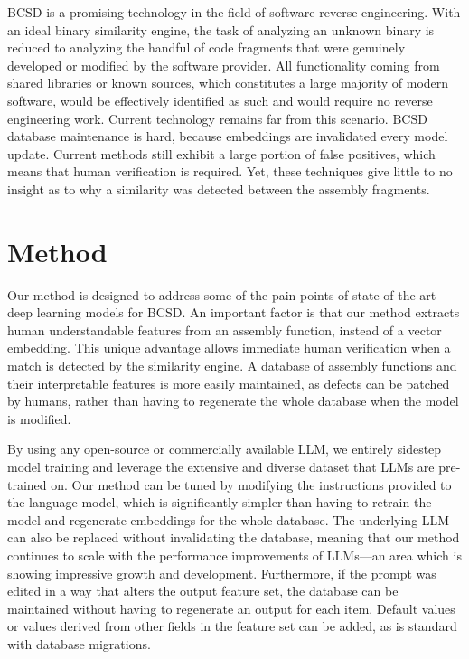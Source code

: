 BCSD is a promising technology in the field of software reverse engineering. With an ideal binary similarity engine,
the task of analyzing an unknown binary is reduced to analyzing the handful of code fragments that were genuinely developed
or modified by the software provider. All functionality coming from shared libraries or known sources, which constitutes a
large majority of modern software, would be effectively identified as such and would require no reverse engineering work.
Current technology remains far from this scenario. BCSD database maintenance is hard, because embeddings are invalidated
every model update. Current methods still exhibit a large portion of false positives, which means that human verification
is required. Yet, these techniques give little to no insight as to why a similarity was detected between the assembly fragments.

\section{Method}

Our method is designed to address some of the pain points of state-of-the-art deep learning models for BCSD.
An important factor is that our method extracts human understandable features from an assembly function, instead
of a vector embedding. This unique advantage allows immediate human verification when a match is detected by the similarity
engine. A database of assembly functions and their interpretable features is more easily maintained, as defects can
be patched by humans, rather than having to regenerate the whole database when the model is modified.

By using any open-source or commercially available LLM, we entirely sidestep model training and leverage the extensive
and diverse dataset that LLMs are pre-trained on. Our method can be tuned by modifying the instructions provided to
the language model, which is significantly simpler than having to retrain the model and regenerate embeddings for the whole database.
The underlying LLM can also be replaced without invalidating the database, meaning that our method continues
to scale with the performance improvements of LLMs---an area which is showing impressive growth and development. Furthermore, if
the prompt was edited in a way that alters the output feature set, the database can be maintained without
having to regenerate an output for each item. Default values or values derived from other fields in the feature set can be added,
as is standard with database migrations.

